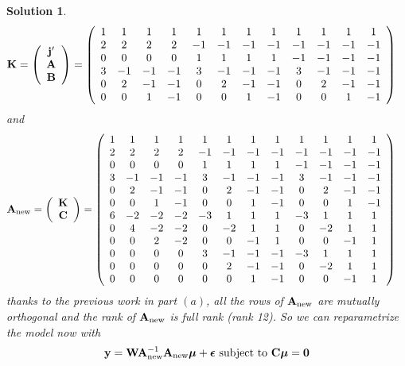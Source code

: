 \documentclass[11pt]{article}
\newtheorem{sol}{Solution}
\begin{document}
\begin{sol}
     \begin{align*}
     	{\bf K} &= \left(\begin{array}{c} {\bf j}'\\ {\bf A}\\ {\bf B}\end{array}\right) = \left(\begin{array}{cccccccccccc} 1&1&1&1&1&1&1&1&1&1&1&1\\ 2&2&2&2&-1&-1&-1&-1&-1&-1&-1&-1\\ 0 &0&0&0&1&1&1&1&-1&-1&-1&-1 \\ 3&-1&-1&-1&3&-1&-1&-1&3&-1&-1&-1\\ 0 &2&-1&-1&0&2&-1&-1&0&2&-1&-1\\ 0&0&1&-1&0&0&1&-1&0&0&1&-1\end{array}\right)
     \end{align*}
     and 
     \begin{align*}
     	{\bf A}_{\text{new}} &= \left(\begin{array}{c} {\bf K}\\ {\bf C}\end{array}\right) = \left(\begin{array}{cccccccccccc} 1&1&1&1&1&1&1&1&1&1&1&1\\ 2&2&2&2&-1&-1&-1&-1&-1&-1&-1&-1\\ 0 &0&0&0&1&1&1&1&-1&-1&-1&-1 \\ 3&-1&-1&-1&3&-1&-1&-1&3&-1&-1&-1\\ 0 &2&-1&-1&0&2&-1&-1&0&2&-1&-1\\ 0&0&1&-1&0&0&1&-1&0&0&1&-1 \\6&-2&-2&-2&-3&1&1&1&-3&1&1&1\\  0&4&-2&-2&0&-2&1&1&0&-2&1&1\\  0&0&2&-2&0&0&-1&1&0&0&-1&1\\
		0&0&0&0&3&-1&-1&-1&-3&1&1&1\\  0&0&0&0&0&2&-1&-1&0&-2&1&1 \\  0&0&0&0&0&0&1&-1&0&0&-1&1\end{array}\right)
     \end{align*}
     thanks to the previous work in part $(a)$, all the rows of ${\bf A}_{\text{new}}$ are mutually orthogonal and the rank of ${\bf A}_{\text{new}}$ is full rank (rank 12).\vskip 2mm
     So we can reparametrize the model now with
     \begin{align*}
     	{\bf y} &= {\bf W}{\bf A}_{\text{new}}^{-1}{\bf A}_{\text{new}}{\bm \mu} + {\bm \epsilon}  \text{ subject to } {\bf C}{\bm\mu} = {\bf 0}\\

\end{align*}
\end{sol}
\end{document}
